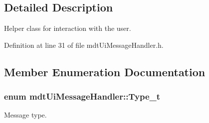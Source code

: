 \subsection{Detailed Description}
Helper class for interaction with the user. 

Definition at line 31 of file mdt\-Ui\-Message\-Handler.\-h.



\subsection{Member Enumeration Documentation}
\hypertarget{classmdt_ui_message_handler_a115062a2ab56f3d7386d35e34f075fcf}{
\subsubsection[{Type\-\_\-t}]{\setlength{\rightskip}{0pt plus 5cm}enum {\bf mdt\-Ui\-Message\-Handler\-::\-Type\-\_\-t}}}\label{classmdt_ui_message_handler_a115062a2ab56f3d7386d35e34f075fcf}


Message type. 

